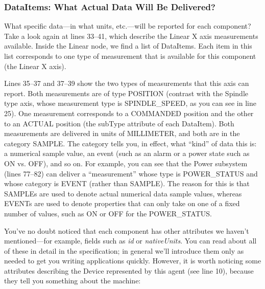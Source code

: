 \subsubsection{DataItems: What Actual Data Will Be Delivered?}

What specific data---in what units, etc.---will be reported for each
component?  Take a look again
at lines 33--41, which describe the Linear X axis measurements
available.  Inside the Linear node, we find a list of DataItems.  Each
item in this list corresponds to one type of measurement that is
available for this component (the Linear X axis).

Lines 35--37 and 37--39  show the two types of measurements that this
axis can report.  Both measurements are of type POSITION (contrast with
the Spindle type axis, whose measurement type is SPINDLE\_SPEED, as you
can see in line 25).  One measurement corresponds to a COMMANDED
position and the other to an ACTUAL position (the subType attribute of
each DataItem).  Both measurements are delivered in units of MILLIMETER,
and both are in the category SAMPLE.  The category tells you, in effect,
what ``kind'' of data this is:  a numerical sample value, an event (such
as an alarm or a power state such as ON vs. OFF), and so on.  For
example, you can see that the Power subsystem (lines 77--82) can deliver
a ``measurement'' whose type is POWER\_STATUS and whose category is
EVENT (rather than SAMPLE).  The reason for this is that SAMPLEs are
used to denote actual numerical data sample values, whereas EVENTs are
used to denote properties that can only take on one of a fixed number of
values, such as ON or OFF for the POWER\_STATUS.  


You've no doubt noticed that each component has other attributes we
haven't mentioned---for example, fields such as \emph{id} or
\emph{nativeUnits}.  You can read about all of these in detail in the
\mtc{} specification; in general we'll introduce them only as needed to
get you writing applications quickly.  However, it is worth noticing
some attributes describing the Device represented by this agent (see
line 10), because they tell you something about the machine:

